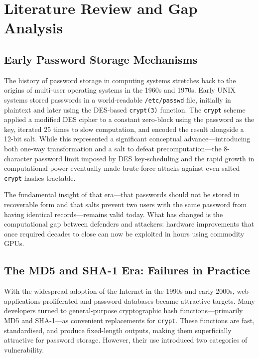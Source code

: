 \chapter{Literature Review and Gap Analysis}
\label{chap:literature}

\section{Early Password Storage Mechanisms}
\label{sec:lit_early}

The history of password storage in computing systems stretches back to the origins of multi-user operating systems in the 1960s and 1970s. Early UNIX systems stored passwords in a world-readable \texttt{/etc/passwd} file, initially in plaintext and later using the DES-based \texttt{crypt(3)} function. The \texttt{crypt} scheme applied a modified DES cipher to a constant zero-block using the password as the key, iterated 25 times to slow computation, and encoded the result alongside a 12-bit salt. While this represented a significant conceptual advance---introducing both one-way transformation and a salt to defeat precomputation---the 8-character password limit imposed by DES key-scheduling and the rapid growth in computational power eventually made brute-force attacks against even salted \texttt{crypt} hashes tractable.

The fundamental insight of that era---that passwords should not be stored in recoverable form and that salts prevent two users with the same password from having identical records---remains valid today. What has changed is the computational gap between defenders and attackers: hardware improvements that once required decades to close can now be exploited in hours using commodity GPUs.

\section{The MD5 and SHA-1 Era: Failures in Practice}
\label{sec:lit_md5}

With the widespread adoption of the Internet in the 1990s and early 2000s, web applications proliferated and password databases became attractive targets. Many developers turned to general-purpose cryptographic hash functions---primarily MD5 and SHA-1---as convenient replacements for \texttt{crypt}. These functions are fast, standardised, and produce fixed-length outputs, making them superficially attractive for password storage. However, their use introduced two categories of vulnerability.

